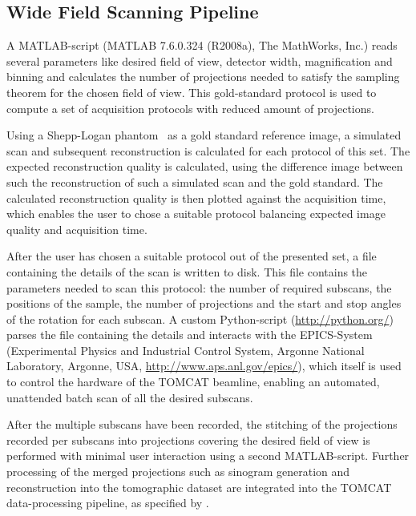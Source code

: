 \subsection{Wide Field Scanning Pipeline}
\label{subsec:wfs-setup}
A MATLAB-script (MATLAB\textsuperscript{\textregistered} 7.6.0.324 (R2008a), The MathWorks, Inc.) reads several parameters like desired field of view, detector width, magnification and binning and calculates the number of projections needed to satisfy the sampling theorem for the chosen field of view. This gold-standard protocol is used to compute a set of acquisition protocols with reduced amount of projections.

Using a Shepp-Logan phantom~\cite{Shepp1974} as \cbstart a gold standard reference \cbend image, a simulated scan and subsequent reconstruction is calculated for each protocol of this set. The expected reconstruction quality is calculated, \cbstart using the difference image between such the reconstruction of such a simulated scan \cbend and the gold standard\cbdelete. The calculated reconstruction quality is then plotted against the acquisition time, which enables the user to chose a suitable protocol balancing expected image quality and acquisition time.

After the user has chosen a suitable protocol out of the presented set, a file containing the details of the scan is written to disk. This file contains the parameters needed to scan this protocol: the number of required subscans, the positions of the sample, the number of projections and the start and stop angles of the rotation for each subscan. A custom Python-script (\url{http://python.org/}) parses the file containing the details and interacts with the EPICS-System (Experimental Physics and Industrial Control System, Argonne National Laboratory, Argonne, USA, \url{http://www.aps.anl.gov/epics/}), which itself is used to control the hardware of the TOMCAT beamline, enabling an automated, unattended batch scan of all the desired subscans.

After the multiple subscans have been recorded, the stitching of the projections recorded per subscans into projections covering the desired field of view is performed with minimal user interaction using a second MATLAB-script. Further processing of the merged projections such as sinogram generation and reconstruction into the tomographic dataset are integrated into the TOMCAT data-processing pipeline, as specified by
\ifhtml
	\citet{Hintermueller2009}%
\else
\fi%
.

